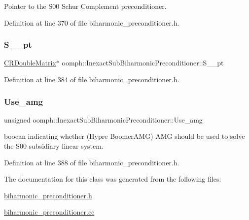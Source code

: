 Pointer to the S00 Schur Complement preconditioner. 



Definition at line 370 of file biharmonic\+\_\+preconditioner.\+h.

\mbox{\label{classoomph_1_1InexactSubBiharmonicPreconditioner_ad9c783c3402ddaab0a56b9efcf7a8ec3}} 
\subsubsection{\texorpdfstring{S\+\_\+\_\+pt}{S\_00\_pt}}
{\footnotesize\ttfamily \hyperlink{classoomph_1_1CRDoubleMatrix}{C\+R\+Double\+Matrix}$\ast$ oomph\+::\+Inexact\+Sub\+Biharmonic\+Preconditioner\+::\+S\+\_\+\_\+pt}



Definition at line 384 of file biharmonic\+\_\+preconditioner.\+h.

\mbox{\label{classoomph_1_1InexactSubBiharmonicPreconditioner_a31f83c027a5423b221a12f5b86649394}} 
\subsubsection{\texorpdfstring{Use\+\_\+amg}{Use\_amg}}
{\footnotesize\ttfamily unsigned oomph\+::\+Inexact\+Sub\+Biharmonic\+Preconditioner\+::\+Use\+\_\+amg}



booean indicating whether (Hypre Boomer\+A\+MG) A\+MG should be used to solve the S00 subsidiary linear system. 



Definition at line 388 of file biharmonic\+\_\+preconditioner.\+h.



The documentation for this class was generated from the following files\+:\begin{DoxyCompactItemize}
\item 
\hyperlink{biharmonic__preconditioner_8h}{biharmonic\+\_\+preconditioner.\+h}\item 
\hyperlink{biharmonic__preconditioner_8cc}{biharmonic\+\_\+preconditioner.\+cc}\end{DoxyCompactItemize}
